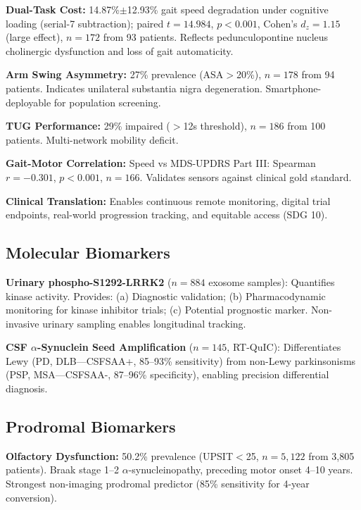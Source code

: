 \documentclass[11pt]{article}
\begin{document}
\textbf{Dual-Task Cost:} 14.87\%$\pm$12.93\% gait speed degradation under cognitive loading (serial-7 subtraction); paired $t=14.984$, $p<0.001$, Cohen's $d_z=1.15$ (large effect), $n=172$ from 93 patients. Reflects pedunculopontine nucleus cholinergic dysfunction and loss of gait automaticity\cite{bohnen2013cholinergic,raffegeau2019meta}.

\textbf{Arm Swing Asymmetry:} 27\% prevalence (ASA$>$20\%), $n=178$ from 94 patients. Indicates unilateral substantia nigra degeneration. Smartphone-deployable for population screening\cite{adams2024using}.

\textbf{TUG Performance:} 29\% impaired ($>$12s threshold\cite{nocera2013tug}), $n=186$ from 100 patients. Multi-network mobility deficit.

\textbf{Gait-Motor Correlation:} Speed vs MDS-UPDRS Part III: Spearman $r=-0.301$, $p<0.001$, $n=166$. Validates sensors against clinical gold standard.

\textbf{Clinical Translation:} Enables continuous remote monitoring, digital trial endpoints, real-world progression tracking, and equitable access (SDG 10).

\subsection{Molecular Biomarkers}

\textbf{Urinary phospho-S1292-LRRK2} ($n=884$ exosome samples)\cite{fraser2016ser}: Quantifies kinase activity. Provides: (a) Diagnostic validation; (b) Pharmacodynamic monitoring for kinase inhibitor trials\cite{simuni2024lrrk2}; (c) Potential prognostic marker. Non-invasive urinary sampling enables longitudinal tracking.

\textbf{CSF $\alpha$-Synuclein Seed Amplification} ($n=145$, RT-QuIC\cite{concha2024alpha}): Differentiates Lewy (PD, DLB—CSFSAA+, 85--93\% sensitivity\cite{siderowf2023csf}) from non-Lewy parkinsonisms (PSP, MSA—CSFSAA-, 87--96\% specificity), enabling precision differential diagnosis.

\subsection{Prodromal Biomarkers}

\textbf{Olfactory Dysfunction:} 50.2\% prevalence (UPSIT$<$25\cite{doty1984smell}, $n=5,122$ from 3,805 patients). Braak stage 1--2 $\alpha$-synucleinopathy\cite{braak2003staging}, preceding motor onset 4--10 years. Strongest non-imaging prodromal predictor (85\% sensitivity for 4-year conversion\cite{jennings2017conversion}).
\end{document}
